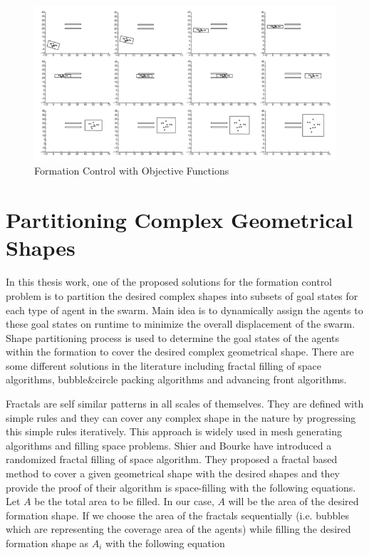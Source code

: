 \begin{figure}[H]
	\caption{Formation Control with Objective Functions \cite{25}} \label{kumar_belta}
	\centering
	\includegraphics[scale = 0.8]{manifold}
\end{figure}



\section{Partitioning Complex Geometrical Shapes}

In this thesis work, one of the proposed solutions for the formation control problem is to partition the desired complex shapes into subsets of goal states for each type of agent in the swarm. Main idea is to dynamically assign the agents to these goal states on runtime to minimize the overall displacement of the swarm. Shape partitioning process is used to determine the goal states of the agents within the formation to cover the desired complex geometrical shape. There are some different solutions in the literature including fractal filling of space algorithms, bubble$\&$circle packing algorithms and advancing front algorithms. 

Fractals are self similar  patterns in all scales of themselves. They are defined with simple rules and they can cover any complex shape in the nature by progressing this simple rules iteratively. This approach is widely used in mesh generating algorithms and filling space problems.  Shier and Bourke \cite{26} have introduced a randomized fractal filling of space algorithm. They proposed a fractal based method to cover a given geometrical shape with the desired shapes and they provide the proof of their algorithm is space-filling with the following equations. Let $A$ be the total area to be filled. In our case, $A$ will be the area of the desired formation shape. If we choose the area of the fractals sequentially (i.e. bubbles which are representing the coverage area of the agents)  while filling the desired formation shape as $A_i$ with the following equation

